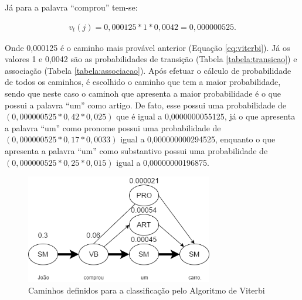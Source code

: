 Já para a palavra ``comprou'' tem-se:

\begin{equation}
\begin{split}
v_t(j) = 0,000125 * 1 * 0,0042 = 0,000000525.
\end{split}
\label{eq:comprou}
\end{equation}

Onde
0,000125 é o caminho mais provável anterior (Equação \ref{eq:viterbi}). Já os
valores 1 e 0,0042 são as probabilidades de transição (Tabela
\ref{tabela:transicao}) e associação (Tabela \ref{tabela:associacao}).
Após efetuar o cálculo de probabilidade de todos os caminhos, é escolhido o
caminho que tem a maior probabilidade, sendo que neste caso o caminoh que
apresenta a maior probabilidade é o que possui a palavra ``um'' como artigo.
De fato, esse possui uma probabilidade de $ (0,000000525 *
0,42 * 0,025)$ que é igual a 0,0000000055125, já o que apresenta a palavra
``um'' como pronome possui uma probabilidade de $(0,000000525 * 0,17 * 0,0033)$
igual a 0,000000000294525, enquanto o que apresenta a palavra ``um'' como
substantivo possui uma probabilidade de $(0,000000525 * 0,25 * 0,015)$ igual a
0,00000000196875.


\begin{figure}[htbp]
\centering
\includegraphics[height=180px]{imagens/markov2.png}
\caption{Caminhos definidos para a classificação pelo Algoritmo de Viterbi}
\label{fig:markov2}
\end{figure}


%
%
%


